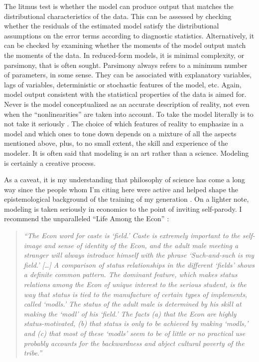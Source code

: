 \documentclass[10pt]{article}
\begin{document}
The litmus test is whether the model can produce output that matches the distributional characteristics of the data. This can be assessed by checking whether the residuals of the estimated model satisfy the distributional assumptions on the error terms according to diagnostic statistics. Alternatively, it can be checked by examining whether the moments of the model output match the moments of the data. In reduced-form models, it is minimal complexity, or parsimony, that is often sought. Parsimony always refers to a minimum number of parameters, in some sense. They can be associated with explanatory variables, lags of variables, deterministic or stochastic features of the model, etc. Again, model output consistent with the statistical properties of the data is aimed for. Never is the model conceptualized as an accurate description of reality, not even when the ``nonlinearities'' are taken into account. To take the model literally is to not take it seriously \citep{Thompson2022}. The choice of which features of reality to emphasize in a model and which ones to tone down depends on a mixture of all the aspects mentioned above, plus, to no small extent, the skill and experience of the modeler. It is often said that modeling is an art rather than a science. Modeling is certainly a creative process.

As a caveat, it is my understanding that philosophy of science has come a long way since the people whom I'm citing here were active and helped shape the epistemological background of the training of my generation \citep{Schindler2018}. On a lighter note, modeling is taken seriously in economics to the point of inviting self-parody. I recommend the unparalleled ``Life Among the Econ'' \citep{Leijonhufvud1973}:
\begin{quote}\it
``The Econ word for caste is `field.' Caste is extremely important to the self-image and sense of identity of the Econ, and the adult male meeting a stranger will always introduce himself with the phrase `Such-and-such is my field.' [\ldots] A comparison of status relationships in the different `fields' shows a definite common pattern. The dominant feature, which makes status relations among the Econ of unique interest to the serious student, is the way that status is tied to the manufacture of certain types of implements, called `modls.' The status of the adult male is determined by his skill at making the `modl' of his `field.' The facts (a) that the Econ are highly status-motivated, (b) that status is only to be achieved by making `modls,' and (c) that most of these `modls' seem to be of little or no practical use probably accounts for the backwardness and abject cultural poverty of the tribe.''
\end{quote}
\end{document}
